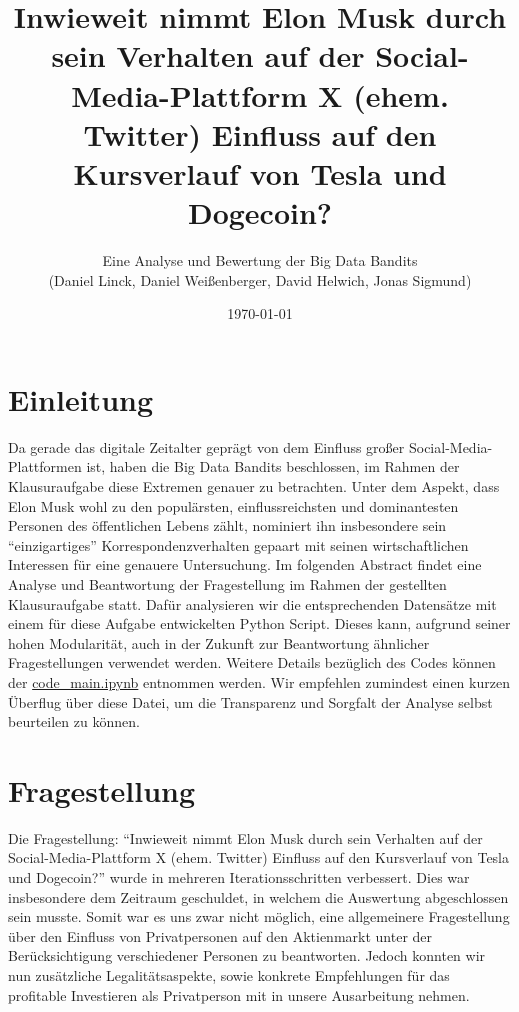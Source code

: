\documentclass{article}
\title{\textbf {Inwieweit nimmt Elon Musk durch sein Verhalten auf der Social-Media-Plattform X (ehem. Twitter) Einfluss auf den Kursverlauf von Tesla und Dogecoin?}}
\author{Eine Analyse und Bewertung der Big Data Bandits \\ (Daniel Linck, Daniel Weißenberger, David Helwich, Jonas Sigmund)}
\date{\today}
\begin{document}
\maketitle

\tableofcontents
\newpage

\section{Einleitung}
Da gerade das digitale Zeitalter geprägt von dem Einfluss großer Social-Media-Plattformen ist, haben die Big Data Bandits beschlossen, im Rahmen der Klausuraufgabe diese Extremen genauer zu betrachten.
Unter dem Aspekt, dass Elon Musk wohl zu den populärsten, einflussreichsten und dominantesten Personen des öffentlichen Lebens zählt, nominiert ihn insbesondere sein ``einzigartiges'' Korrespondenzverhalten gepaart mit seinen wirtschaftlichen Interessen für eine genauere Untersuchung.
Im folgenden Abstract findet eine Analyse und Beantwortung der Fragestellung im Rahmen der gestellten Klausuraufgabe statt.
Dafür analysieren wir die entsprechenden Datensätze mit einem für diese Aufgabe entwickelten Python Script.
Dieses kann, aufgrund seiner hohen Modularität, auch in der Zukunft zur Beantwortung ähnlicher Fragestellungen verwendet werden.
Weitere Details bezüglich des Codes können der \href{https://github.com/alphaname007/BigDataBandits/blob/19beac1a6b5469aed05b4a6c072883810df6aacd/code\_main.ipynb}{code\_main.ipynb} entnommen werden.
Wir empfehlen zumindest einen kurzen Überflug über diese Datei, um die Transparenz und Sorgfalt der Analyse selbst beurteilen zu können.


\section{Fragestellung}
Die Fragestellung: ``Inwieweit nimmt Elon Musk durch sein Verhalten auf der Social-Media-Plattform X (ehem. Twitter) Einfluss auf den Kursverlauf von Tesla und Dogecoin?'' wurde in mehreren Iterationsschritten verbessert. 
Dies war insbesondere dem Zeitraum geschuldet, in welchem die Auswertung abgeschlossen sein musste.
Somit war es uns zwar nicht möglich, eine allgemeinere Fragestellung über den Einfluss von Privatpersonen auf den Aktienmarkt unter der Berücksichtigung verschiedener Personen zu beantworten.
Jedoch konnten wir nun zusätzliche Legalitätsaspekte, sowie konkrete Empfehlungen für das profitable Investieren als Privatperson mit in unsere Ausarbeitung nehmen.
\end{document}
